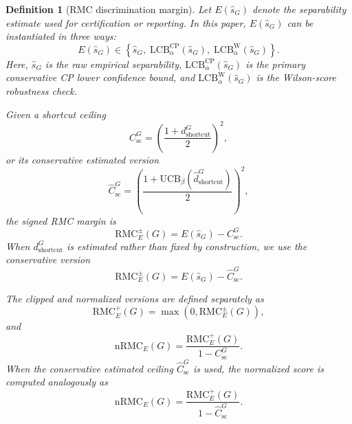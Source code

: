 \documentclass[conference]{IEEEtran}
\newtheorem{definition}{Definition}
\theoremstyle{remark}
\newcommand{\LCB}{\mathrm{LCB}}
\newcommand{\UCB}{\mathrm{UCB}}
\newcommand{\RMC}{\mathrm{RMC}}
\newcommand{\shat}{\hat{s}_G}
\newcommand{\shortcutDisc}{d_{\mathrm{shortcut}}^{G}}
\newcommand{\hatshortcutDisc}{\hat d_{\mathrm{shortcut}}^{G}}
\newcommand{\shortcutCeiling}{C_{\mathrm{sc}}^{G}}
\newcommand{\hatshortcutCeiling}{\widehat{C}_{\mathrm{sc}}^{G}}
\begin{document}
\begin{definition}[RMC discrimination margin]
\label{def:rmc}
Let $E(\shat)$ denote the separability estimate used for certification or
reporting. In this paper, $E(\shat)$ can be instantiated in three ways:
\begin{equation}\label{eq:formula-44}
E(\shat)\in
\left\{
\shat,\;
\LCB^{\mathrm{CP}}_{\alpha}(\shat),\;
\LCB^{\mathrm{W}}_{\alpha}(\shat)
\right\}.
\end{equation}
Here, $\shat$ is the raw empirical separability, 
$\LCB^{\mathrm{CP}}_{\alpha}(\shat)$ is the primary conservative CP lower
confidence bound, and $\LCB^{\mathrm{W}}_{\alpha}(\shat)$ is the Wilson-score
robustness check.

Given a shortcut ceiling
\begin{equation}\label{eq:formula-45}
\shortcutCeiling=
\left(\frac{1+\shortcutDisc}{2}\right)^2,
\end{equation}
or its conservative estimated version
\begin{equation}\label{eq:formula-46}
\hatshortcutCeiling=
\left(\frac{1+\UCB_{\beta}(\hatshortcutDisc)}{2}\right)^2,
\end{equation}
the signed RMC margin is
\begin{equation}\label{eq:formula-47}
\RMC_E^{\pm}(G)
=
E(\shat)-\shortcutCeiling .
\end{equation}
When $\shortcutDisc$ is estimated rather than fixed by construction, we use the
conservative version
\begin{equation}\label{eq:formula-48}
\RMC_E^{\pm}(G)
=
E(\shat)-\hatshortcutCeiling .
\end{equation}

The clipped and normalized versions are defined separately as
\begin{equation}\label{eq:formula-49}
\RMC_E^{+}(G)
=
\max(0,\RMC_E^{\pm}(G)),
\end{equation}
and
\begin{equation}\label{eq:formula-50}
\mathrm{nRMC}_E(G)
=
\frac{\RMC_E^{+}(G)}{1-\shortcutCeiling}.
\end{equation}
When the conservative estimated ceiling $\hatshortcutCeiling$ is used, the normalized
score is computed analogously as
\begin{equation}\label{eq:formula-51}
\mathrm{nRMC}_E(G)
=
\frac{\RMC_E^{+}(G)}{1-\hatshortcutCeiling}.
\end{equation}
\end{definition}
\end{document}
